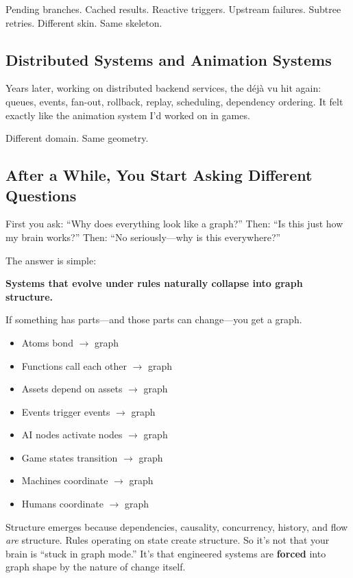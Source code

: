 Pending branches. Cached results. Reactive triggers. Upstream failures. Subtree retries.  
Different skin. Same skeleton.

\subsection{Distributed Systems and Animation Systems}

Years later, working on distributed backend services, the déjà vu hit again: queues, events, fan-out, rollback, replay, scheduling, dependency ordering.  
It felt exactly like the animation system I'd worked on in games.

Different domain. Same geometry.

\subsection{After a While, You Start Asking Different Questions}

First you ask: ``Why does everything look like a graph?''  
Then: ``Is this just how my brain works?''  
Then: ``No seriously—why is this everywhere?''

The answer is simple:

\textbf{Systems that evolve under rules naturally collapse into graph structure.}

If something has parts—and those parts can change—you get a graph.

\begin{itemize}
    \item Atoms bond $\rightarrow$ graph
    \item Functions call each other $\rightarrow$ graph
    \item Assets depend on assets $\rightarrow$ graph
    \item Events trigger events $\rightarrow$ graph
    \item AI nodes activate nodes $\rightarrow$ graph
    \item Game states transition $\rightarrow$ graph
    \item Machines coordinate $\rightarrow$ graph
    \item Humans coordinate $\rightarrow$ graph
\end{itemize}

Structure emerges because dependencies, causality, concurrency, history, and flow \textit{are} structure.  
Rules operating on state create structure.  
So it’s not that your brain is “stuck in graph mode.”  
It’s that engineered systems are \textbf{forced} into graph shape by the nature of change itself.


